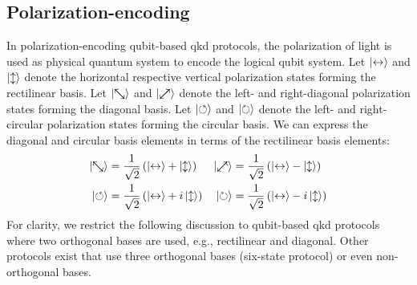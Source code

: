 \FloatBarrier
\subsection{Polarization-encoding}

In polarization-encoding qubit-based \gls{qkd} protocols, the polarization of light is used as physical quantum system to encode the logical qubit system.
Let $\ket{\leftrightarrow}$ and $\ket{\updownarrow}$ denote the horizontal respective vertical polarization states forming the rectilinear basis.
Let $\ket{\nwsearrow}$ and $\ket{\neswarrow}$ denote the left- and right-diagonal polarization states forming the diagonal basis.
Let $\ket{\circlearrowleft}$ and $\ket{\circlearrowright}$ denote the left- and right-circular polarization states forming the circular basis.
We can express the diagonal and circular basis elements in terms of the rectilinear basis elements:
\begin{align}
	\ket{\nwsearrow}
	&=
	\frac{1}{\sqrt{2}}
	\left(
		\ket{\leftrightarrow}
		+
		\ket{\updownarrow}
	\right)
	&
	\ket{\neswarrow}
	&=
	\frac{1}{\sqrt{2}}
	\left(
		\ket{\leftrightarrow}
		-
		\ket{\updownarrow}
	\right)
	\\
	\ket{\circlearrowleft}
	&=
	\frac{1}{\sqrt{2}}
	\left(
		\ket{\leftrightarrow}
		+
		i\ket{\updownarrow}
	\right)
	&
	\ket{\circlearrowright}
	&=
	\frac{1}{\sqrt{2}}
	\left(
		\ket{\leftrightarrow}
		-
		i\ket{\updownarrow}
	\right)
\end{align}
For clarity, we restrict the following discussion to qubit-based \gls{qkd} protocols where two orthogonal bases are used, e.g., rectilinear and diagonal.
Other protocols exist that use three orthogonal bases (six-state protocol) or even non-orthogonal bases.

